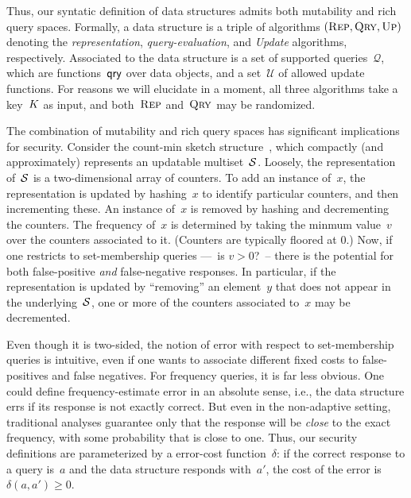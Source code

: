 Thus, our syntatic definition of data structures admits both mutability and rich
query spaces.  Formally, a data structure is a triple of algorithms $(\textnormal{\textsc{Rep}},
\textnormal{\textsc{Qry}}, \textnormal{\textsc{Up}})$ denoting the \emph{representation}, \emph{query-evaluation}, and
\emph{Update} algorithms, respectively. Associated to the data structure is a
set of supported queries~$\mathcal{Q}$, which are functions~$\mathsf{qry}$ over data
objects, and a set~$\mathcal{U}$ of allowed update functions.  For reasons we
will elucidate in a moment, all three algorithms take a key~$K$ as input, and
both~$\textnormal{\textsc{Rep}}$ and~$\textnormal{\textsc{Qry}}$ may be randomized.


The combination of mutability and rich query spaces has significant
implications for security.  Consider the count-min
sketch structure~\cite{cormode2005improved}, which compactly (and approximately)
represents an updatable multiset~$\mathcal{S}$.  
Loosely, the representation of~$\mathcal{S}$ is a two-dimensional array
of counters. To add an instance of~$x$, the representation is
updated by hashing~$x$ to identify particular counters, and then
incrementing these.  An instance of~$x$ is removed
by hashing and decrementing the counters.  
The frequency of~$x$ is determined by taking
the minmum value~$v$ over the counters associated to it. (Counters are
typically floored at 0.)  Now, if one
restricts to set-membership queries ---~is $v>0$?~-- there is the
potential for both false-positive \emph{and} false-negative
responses.  In particular, if the representation is updated by
``removing'' an element~$y$ that does not appear in the
underlying~$\mathcal{S}$, one or more of the counters associated to~$x$ may
be decremented.  

Even though it is two-sided, the notion of error with respect to set-membership
queries is intuitive, even if one wants to associate different
fixed costs to false-positives and false negatives.  For frequency
queries, it is far less obvious.   One could define frequency-estimate
error in an absolute sense, i.e., the data structure errs if its
response is not exactly correct.  But even in the non-adaptive
setting, traditional analyses guarantee only that the response will be
\emph{close} to the exact frequency, with some probability that is close
to one.  Thus, our security definitions are parameterized by a
error-cost function~$\delta$: if the correct response to a query is~$a$ and
the data structure responds with~$a'$, the cost of the error is
$\delta(a,a') \geq 0$.  

